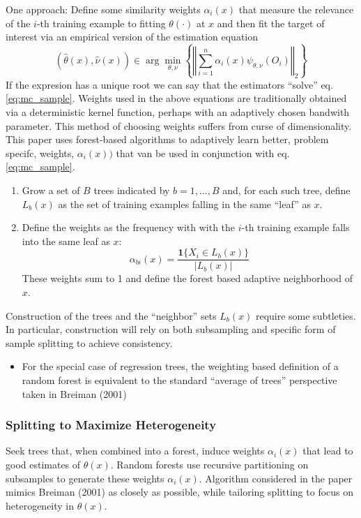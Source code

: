 One approach: Define some similarity weights $\alpha_i(x)$ that measure the relevance of the $i$-th training example to fitting $\theta(\cdot)$ at $x$ and then fit the target of interest via an empirical version of the estimation equation 
\begin{equation}\label{eq:mc_sample}
	\left(\hat{\theta}(x), \hat{\nu}(x)\right) \in \arg\min_{\theta,\nu}\left\{\left\Vert \sum_{i=1}^n \alpha_i(x)\psi_{\theta,\nu}(O_i)\right\Vert_2\right\}
\end{equation}
If the expresion has a unique root we can say that the estimators ``solve'' eq. \ref{eq:mc_sample}. Weights used in the above equations are traditionally obtained via a deterministic kernel function, perhaps with an adaptively chosen bandwith parameter. This method of choosing weights suffers from curse of dimensionality. This paper uses forest-based algorithms to adaptively learn better, problem specifc, weights, $\alpha_i(x))$ that van be used in conjunction with eq. \ref{eq:mc_sample}.
\begin{enumerate}
	\item Grow a set of $B$ trees indicated by $b=1, \dots, B$ and, for each such tree, define $L_b(x)$ as the set of training examples falling in the same ``leaf'' as $x$.
	\item Define the weights as the frequency with with the $i$-th training example falls into the same leaf as $x$:
	\begin{equation}\label{eq:alpha_bi}
		\alpha_{bi}(x) = \frac{\mathbf{1}\{X_i \in L_b(x)\}}{|L_b(x)|}
	\end{equation}
	These weights sum to 1 and define the forest based adaptive neighborhood of $x$.
\end{enumerate}
Construction of the trees and the ``neighbor'' sets $L_b(x)$ require some subtleties. In particular, construction will rely on both subsampling and specific form of sample splitting to achieve consistency.
\begin{itemize}
	\item For the special case of regression trees, the weighting based definition of a random forest is equivalent to the standard ``average of trees'' perspective taken in Breiman (2001) 
\end{itemize}

\subsubsection{Splitting to Maximize Heterogeneity}
Seek trees that, when combined into a forest, induce weights $\alpha_i(x)$ that lead to good estimates of $\theta(x)$. Random forests use recursive partitioning on subsamples to generate these weights $\alpha _i(x)$. Algorithm considered in the paper mimics Breiman (2001) as closely as possible, while tailoring splitting to focus on heterogeneity in $\theta(x)$. 

